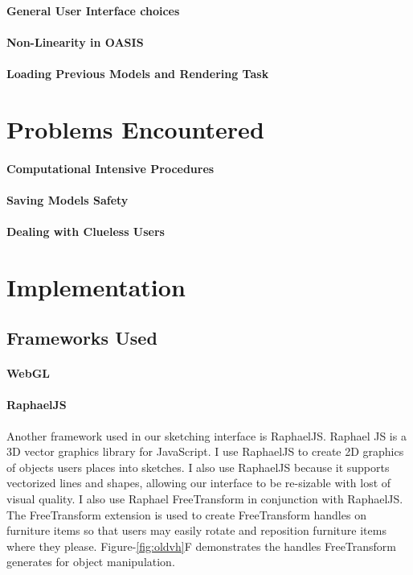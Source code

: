 		\paragraph{General User Interface choices}
		\paragraph{Non-Linearity in OASIS}
		\paragraph{Loading Previous Models and Rendering Task}

	\section{Problems Encountered}
		\paragraph{Computational Intensive Procedures}
		\paragraph{Saving Models Safety}
		\paragraph{Dealing with Clueless Users}

	\section{Implementation}

		\subsection{Frameworks Used}
			\paragraph{WebGL}
			\paragraph{RaphaelJS}
				Another framework used in our sketching interface is RaphaelJS\cite{todo}.
				Raphael JS is a 3D vector graphics library for JavaScript. 
				I use RaphaelJS to create 2D graphics of objects users places into sketches. I also use RaphaelJS because it supports vectorized lines and shapes, allowing our interface  to be re-sizable with lost of visual quality.
				I also use Raphael FreeTransform in conjunction with RaphaelJS\cite{todo}. 
				The FreeTransform extension is used to create FreeTransform handles on furniture items so that users may easily rotate and reposition furniture items where they please.
				Figure-\ref{fig:oldvh}F demonstrates the handles FreeTransform generates for object manipulation.\\


